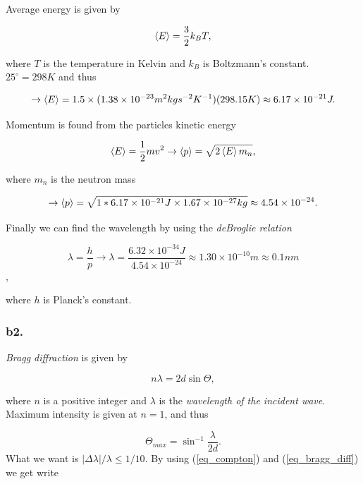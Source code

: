 \documentclass{article}
\begin{document}
Average energy is given by

\begin{equation}
\braket{E} = \frac{3}{2}k_BT,
\end{equation}

where $T$ is the temperature in Kelvin and $k_B$ is Boltzmann's constant. $25^\circ = 298K$ and thus

\begin{equation}
\rightarrow \braket{E} = 1.5\times(1.38\times 10^{-23}m^2kgs^{-2}K^{-1})(298.15K) \approx 6.17\times 10^{-21}J.
\end{equation}

Momentum is found from the particles kinetic energy

\begin{equation}
\braket{E} = \frac{1}{2}mv^2 \rightarrow \braket{p} = \sqrt{2\braket{E}m_n},
\end{equation}

where $m_n$ is the neutron mass

\begin{equation}
\rightarrow \braket{p} = \sqrt{1*6.17\times 10^{-21}J\times 1.67\times 10^{-27}kg} \approx 4.54\times 10^{-24}.
\end{equation}

Finally we can find the wavelength by using the \textit{deBroglie relation} 

\begin{equation}
\lambda = \frac{h}{p} \rightarrow \lambda = \frac{6.32\times 10^{-34}J}{4.54\times 10^{-24}} \approx 1.30\times 10^{-10}m \approx 0.1nm
\end{equation},

where $h$ is Planck's constant.

\subsubsection*{b2.}

\textit{Bragg diffraction} is given by

\begin{equation}
n\lambda = 2d\sin{\Theta}, \label{eq_bragg_diff}
\end{equation}

where $n$ is a positive integer and $\lambda$ is the \textit{wavelength of the incident wave}. Maximum intensity is given at $n=1$, and thus

\begin{equation}
\Theta_{max} = \sin^{-1}{\frac{\lambda}{2d}}.
\end{equation}
What we want is $|\Delta \lambda|/\lambda \leq 1/10$. By using (\ref{eq_compton}) and (\ref{eq_bragg_diff}) we get write
\end{document}
